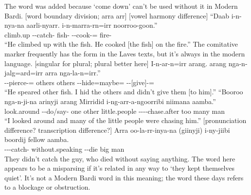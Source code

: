 \begin{exye}
\nt The word  was added because  `come down' can't be used without it in Modern Bardi.
\llg {} [word boundary division; arra \> arr]
\llg {} [vowel harmony difference]
\exy {}
\gll ``Daab i-n-nya-na aarli-nyarr. i-n-marra-rn=irr noorroo-goon.''\\
climb.up --catch- fish- --cook-= fire-\\
\ft ``He climbed up with the fish. He cooked [the fish] on the fire.''
\nt The comitative marker frequently has the form  in the Laves texts, but it's always  in the modern language.
\llg {} [singular for plural; plural better here]
\exy {}
\gll I-n-ar-n=irr arang. arang nga-n-jalg=ard=irr arra nga-la-n=irr.''\\
--pierce-= others others --hide=maybe=  --[give]-=\\
\ft ``He speared other fish. I hid the others and didn't give them [to him].''
\newpage\exy {}
\gll ``Booroo nga-n-ji-na arinyji arang Mirridid i-ng-arr-a-ngoorribi niimana aamba.''\\
look.around --do/say- one other little.people ----chase.after too many man\\
\ft ``I looked around and many of the  little people were chasing him.''
\llg {} [pronunciation difference? transcription difference?]
\exy {}
\gll Arra oo-la-rr-inya-na (giinyji) i-ny-jiibi boordij fellow aamba.\\
 ---catch- without.speaking --die big { } man\\
\ft They didn't catch the guy, who died without saying anything.
\nt The word  here appears to be a misparsing if it's related in any way to  `they kept themselves quiet'. It's not a Modern Bardi word in this meaning; the word these days refers to a blockage or obstruction.
\exy {}

\end{exye}
